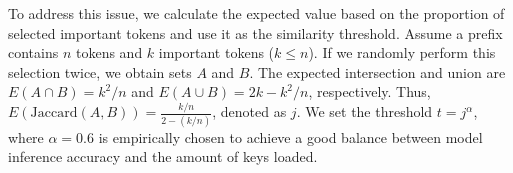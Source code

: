 %
%

To address this issue, we calculate the expected value based on the proportion of selected important tokens and use it as the similarity threshold. 
Assume a prefix contains \(n\) tokens and \(k\) important tokens (\(k \leq n\)). 
If we randomly perform this selection twice, we obtain sets \(A\) and \(B\). 
The expected intersection and union are \(E(A \cap B) = k^2/n\) and \(E(A \cup B) = 2k - k^2/n\), respectively. 
Thus, \(E(\text{Jaccard}(A, B)) = \frac{k/n}{2 - (k/n)}\), denoted as \(j\). 
We set the threshold \(t = j^\alpha\), where \(\alpha = 0.6\) is empirically chosen to achieve a good balance between model inference accuracy and the amount of keys loaded.
